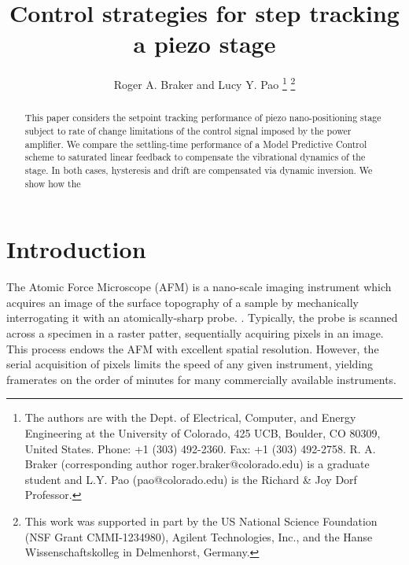 \documentclass[journal,twocolumn,twoside]{IEEEtran}
\begin{document}
\title{Control strategies for step tracking a piezo stage}
\author{Roger A. Braker and Lucy Y. Pao
  \thanks{The authors are with the Dept. of Electrical, Computer, and Energy Engineering at the University of Colorado, 425 UCB, Boulder, CO 80309, United States. Phone: +1 (303) 492-2360. Fax: +1 (303) 492-2758.
    R. A.  Braker (corresponding author roger.braker@colorado.edu) is a graduate student and
    L.Y. Pao (pao@colorado.edu) is the Richard \& Joy Dorf Professor.}
  \thanks{This work was supported in part by the US National Science Foundation (NSF Grant CMMI-1234980), Agilent Technologies, Inc., and the Hanse Wissenschaftskolleg in Delmenhorst, Germany.}
}

\maketitle
\begin{abstract}
  This paper considers the setpoint tracking performance of piezo nano-positioning stage subject to rate of change limitations of the control signal imposed by the power amplifier. We compare the settling-time performance of a Model Predictive Control scheme to saturated linear feedback to compensate the vibrational dynamics of the stage. In both cases, hysteresis and drift are compensated via dynamic inversion. We show how the 
\end{abstract}


\section{Introduction}\label{sec:intro}

The Atomic Force Microscope (AFM) is a nano-scale imaging instrument which acquires an image of the surface topography of a sample by mechanically interrogating it with an atomically-sharp probe.  \cite{abramovitch_tutorial_2007}. Typically, the probe is scanned across a specimen in a raster patter, sequentially acquiring pixels in an image. This process endows the AFM with excellent spatial resolution. However, the serial acquisition of pixels limits the speed of any given instrument, yielding framerates on the order of minutes for many commercially available instruments.

\end{document}
